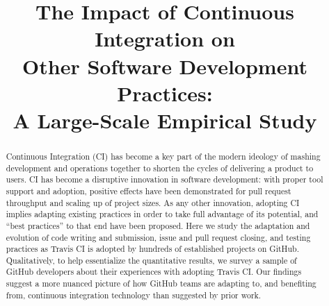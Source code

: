 \documentclass[10pt,conference]{IEEEtran}
\newcommand{\GH}{{\sc GitHub}\xspace}
\newcommand{\Tvis}{{\sc Travis CI}\xspace}
\newcommand\blfootnote[1]{%
  \begingroup
  \renewcommand\thefootnote{}\footnote{#1}%
  \addtocounter{footnote}{-1}%
  \endgroup
}
\begin{document}
\title{The Impact of Continuous Integration on \\Other Software 
Development Practices: \\A Large-Scale Empirical Study}


\author
{
\and
{}
\and
{}
\and
{}
\and
{}
}

\maketitle
\begin{abstract}
Continuous Integration (CI)
has become a key part of the modern ideology 
of mashing development and operations together to shorten the cycles of 
delivering a product to users. 
CI has become a disruptive innovation in software development: with proper 
tool support and adoption, positive effects have been demonstrated for pull 
request throughput and scaling up of project sizes. 
As any other innovation, adopting CI implies adapting existing practices in 
order to take full advantage of its potential, and ``best practices'' to that end 
have been proposed. 
Here we study the adaptation and evolution of code writing and submission,
issue and pull request closing, and testing practices as \Tvis is adopted by 
hundreds of established projects on \GH. 
Qualitatively, to help essentialize the quantitative results, we survey a 
sample of \GH developers about their experiences with adopting \Tvis. 
Our findings suggest a more nuanced picture of how \GH teams are adapting to, and
benefiting from, continuous integration technology than suggested by prior
work.
\end{abstract}







%





\balance

\newpage


\end{document}
